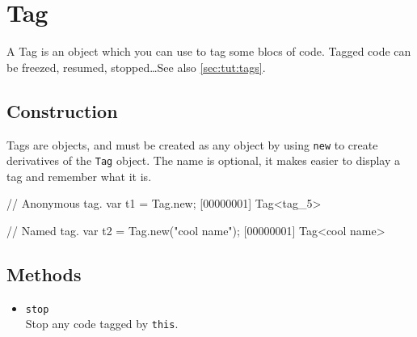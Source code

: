\section{Tag}

A Tag is an object which you can use to tag some blocs of code.
Tagged code can be freezed, resumed, stopped\ldots See also
\autoref{sec:tut:tags}.

\subsection{Construction}
\label{stdlib:tag:ctor}

Tags are objects, and must be created as any object by using
\lstinline{new} to create derivatives of the \lstinline{Tag} object.
The name is optional, it makes easier to display a tag and remember
what it is.

\begin{urbiscript}
// Anonymous tag.
var t1 = Tag.new;
[00000001] Tag<tag_5>

// Named tag.
var t2 = Tag.new("cool name");
[00000001] Tag<cool name>
\end{urbiscript}


\subsection{Methods}
\begin{itemize}
\item \lstinline|stop|~\\
  Stop any code tagged by \lstinline|this|.
\end{itemize}

